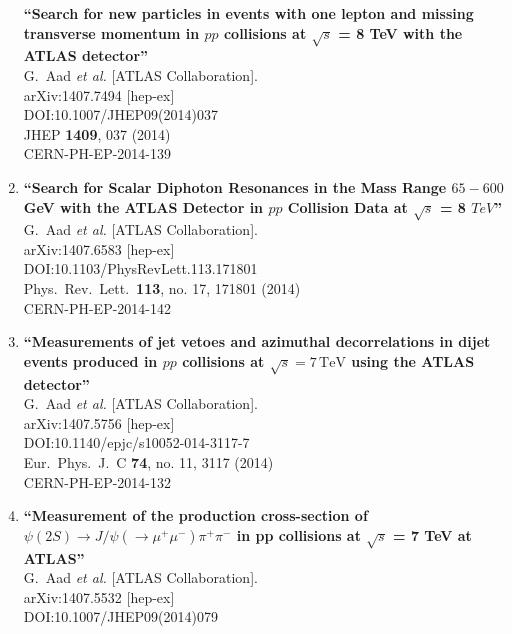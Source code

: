 \documentclass{article}
\begin{document}
\begin{enumerate}
{\bf ``Search for new particles in events with one lepton and missing transverse momentum in $pp$ collisions at $\sqrt{s}$ = 8 TeV with the ATLAS detector''}
  \\{}G.~Aad {\it et al.} [ATLAS Collaboration].
  \\{}arXiv:1407.7494 [hep-ex]
  \\{}DOI:10.1007/JHEP09(2014)037
  \\{}JHEP {\bf 1409}, 037 (2014)
  \\{}CERN-PH-EP-2014-139
\item%
{\bf ``Search for Scalar Diphoton Resonances in the Mass Range $65-600$ GeV with the ATLAS Detector in $pp$ Collision Data at $\sqrt{s}$ = 8 $TeV$''}
  \\{}G.~Aad {\it et al.} [ATLAS Collaboration].
  \\{}arXiv:1407.6583 [hep-ex]
  \\{}DOI:10.1103/PhysRevLett.113.171801
  \\{}Phys.\ Rev.\ Lett.\  {\bf 113}, no. 17, 171801 (2014)
  \\{}CERN-PH-EP-2014-142
\item%
{\bf ``Measurements of jet vetoes and azimuthal decorrelations in dijet events produced in $pp$ collisions at $\sqrt{s}=7\,\mathrm{TeV}$ using the ATLAS detector''}
  \\{}G.~Aad {\it et al.} [ATLAS Collaboration].
  \\{}arXiv:1407.5756 [hep-ex]
  \\{}DOI:10.1140/epjc/s10052-014-3117-7
  \\{}Eur.\ Phys.\ J.\ C {\bf 74}, no. 11, 3117 (2014)
  \\{}CERN-PH-EP-2014-132
\item%
{\bf ``Measurement of the production cross-section of $\psi(2S) \to J/\psi ( \to \mu^{+} \mu^{-}) \pi^{+} \pi^{-}$ in pp collisions at $ \sqrt{s} $ = 7 TeV at ATLAS''}
  \\{}G.~Aad {\it et al.} [ATLAS Collaboration].
  \\{}arXiv:1407.5532 [hep-ex]
  \\{}DOI:10.1007/JHEP09(2014)079

\end{enumerate}
\end{document}
